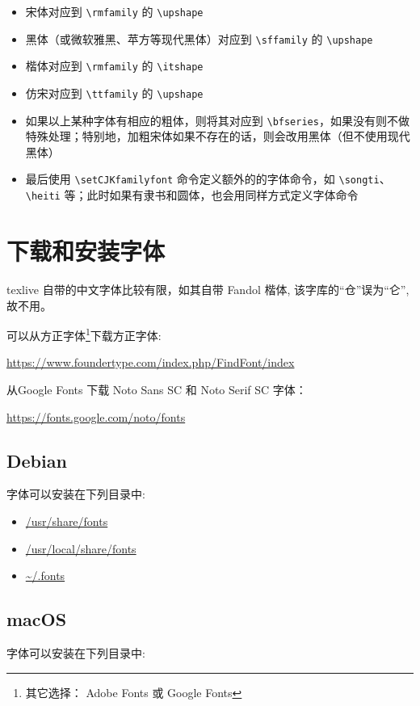 \begin{itemize}
  \item 宋体对应到 \verb|\rmfamily| 的 \verb|\upshape|
  \item 黑体（或微软雅黑、苹方等现代黑体）对应到 \verb|\sffamily| 的 \verb|\upshape|
  \item 楷体对应到 \verb|\rmfamily| 的 \verb|\itshape|
  \item 仿宋对应到 \verb|\ttfamily| 的 \verb|\upshape|
  \item 如果以上某种字体有相应的粗体，则将其对应到 \verb|\bfseries|，如果没有则不做特殊处理；特别地，加粗宋体如果不存在的话，则会改用黑体（但不使用现代黑体）
  \item 最后使用 \verb|\setCJKfamilyfont| 命令定义额外的的字体命令，如 \verb|\songti|、\verb|\heiti| 等；此时如果有隶书和圆体，也会用同样方式定义字体命令
\end{itemize}

\section{下载和安装字体}

texlive 自带的中文字体比较有限，如其自带 Fandol 楷体, 该字库的“仓”误为“仑”, 故不用。

可以从方正字体\footnote{其它选择： Adobe Fonts 或 Google Fonts}下载方正字体:

\url{https://www.foundertype.com/index.php/FindFont/index}

从Google Fonts 下载 Noto Sans SC 和 Noto Serif SC 字体：

\url{https://fonts.google.com/noto/fonts}

\subsection{Debian}

字体可以安装在下列目录中:

\begin{itemize}
  \item \url{/usr/share/fonts}
  \item \url{/usr/local/share/fonts}
  \item \url{~/.fonts}
\end{itemize}

\subsection{macOS}

字体可以安装在下列目录中:

